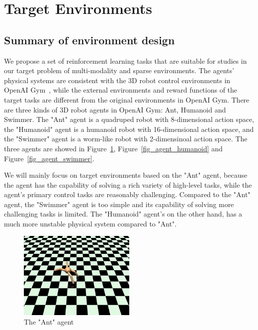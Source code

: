 \section{Target Environments}\label{sec_env}
\subsection{Summary of environment design}
We propose a set of reinforcement learning tasks that are suitable for studies in our target problem of multi-modality and sparse environments. The agents' physical systems are consistent with the 3D robot control environments in OpenAI Gym~\cite{openaigym}, while the external environments and reward functions of the target tasks are different from the original environments in OpenAI Gym. There are three kinds of 3D robot agents in OpenAI Gym: Ant, Humanoid and Swimmer. The "Ant" agent is a quadruped robot with 8-dimensional action space, the "Humanoid" agent is a humanoid robot with 16-dimensional action space, and the "Swimmer" agent is a worm-like robot with 2-dimensinoal action space.  The three agents are showed in Figure~\ref{fig_agent_ant}, Figure~\ref{fig_agent_humanoid} and Figure~\ref{fig_agent_swimmer}.

We will mainly focus on target environments based on the "Ant" agent, because the agent has the capability of solving a rich variety of high-level tasks, while the agent's primary control tasks are reasonably challenging. 
Compared to the "Ant" agent, the "Swimmer" agent is too simple and its capability of solving more challenging tasks is limited. The "Humanoid" agent's  on the other hand, has a much more unstable physical system compared to "Ant". 
\begin{figure}[H]
	\includegraphics[width=0.5\textwidth]{images/agent_ant.png}
	\centering
	\caption{The "Ant" agent}\label{fig_agent_ant}
\end{figure}

